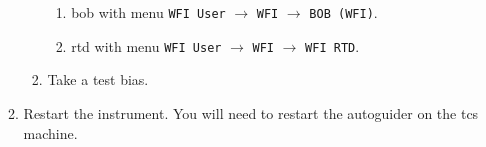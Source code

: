 \documentclass[11pt,fleqn]{book} %
\begin{document}
\begin{enumerate}
\begin{enumerate}
\begin{enumerate}
             \begin{enumerate}
                \item \gls{bob} with menu \texttt{WFI User} $\rightarrow$ \texttt{WFI} $\rightarrow$ \texttt{BOB (WFI)}.
                \item \gls{rtd} with menu \texttt{WFI User} $\rightarrow$ \texttt{WFI} $\rightarrow$ \texttt{WFI RTD}.
             \end{enumerate}
          \item Take a test bias.
        \end{enumerate}
      \item Restart the instrument.  You will need to restart the autoguider on the \gls{tcs} machine.
    \end{enumerate}
\end{enumerate}
\end{document}

